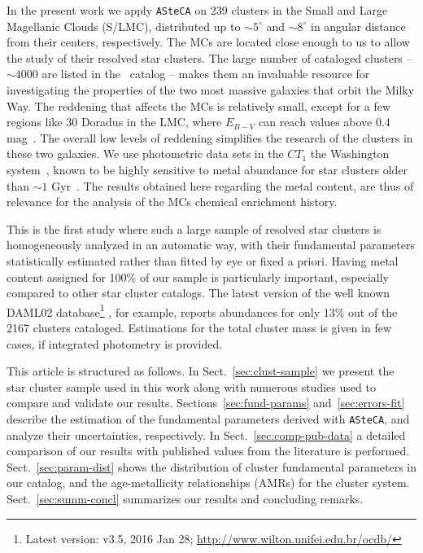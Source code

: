 \documentclass[referee]{aa}
\begin{document}
In the present work we apply \texttt{ASteCA} on 239 clusters in the Small and
Large Magellanic Clouds (S/LMC), distributed up to ${\sim}5^{\circ}$ and $
{\sim}8^{\circ}$ in angular distance from their centers, respectively.
%
The MCs are located close enough to us to allow the study of their resolved star
clusters. The large number of cataloged clusters -- $\sim4000$ are listed in
the~\cite{Bica_2008} catalog -- makes them an invaluable resource for
investigating the properties of the two most massive galaxies that orbit the
Milky Way.
%
The reddening that affects the MCs is relatively small, except for a few regions
like 30 Doradus in the LMC, where $E_{B-V}$ can reach values above $0.4$
mag~\citep{Piatti_2015b}. The overall low levels of reddening simplifies
the research of the clusters in these two galaxies.
%
We use photometric data sets in the $CT_1$ the Washington
system~\citep{Canterna_1976,Geisler_1996}, known to be highly sensitive
to metal abundance for star clusters older than ${\sim}1$
Gyr~\citep{Geisler_1999}.
The results obtained here regarding the metal content, are thus of relevance for
the analysis of the MCs chemical enrichment history.

This is the first study where such a large sample of resolved star clusters is
homogeneously analyzed in an automatic way, with their fundamental
parameters statistically estimated rather than fitted by eye or fixed a priori.
%
Having metal content assigned for 100\% of our sample is particularly
important, especially compared to other star cluster catalogs. The latest
version of the well known DAML02 database\footnote{Latest version: v3.5, 2016
Jan 28; \url{http://www.wilton.unifei.edu.br/ocdb/}}
\citep{Dias_2002}, for example, reports abundances for only 13\% out of the 2167
clusters cataloged. Estimations for the total cluster mass is given in few
cases, if integrated photometry is provided.

This article is structured as follows.
In Sect.~\ref{sec:clust-sample} we present the star cluster sample used in
this work along with numerous studies used to compare and validate our
results.
Sections~\ref{sec:fund-params} and~\ref{sec:errors-fit} describe the estimation
of the fundamental parameters derived with \texttt{ASteCA}, and analyze their
uncertainties, respectively.
In Sect.~\ref{sec:comp-pub-data} a detailed comparison of our results with
published values from the literature is performed.
Sect.~\ref{sec:param-dist} shows the distribution of cluster fundamental
parameters in our catalog, and the age-metallicity relationships (AMRs) for the
cluster system.
Sect.~\ref{sec:summ-concl} summarizes our results and concluding remarks.
\end{document}
